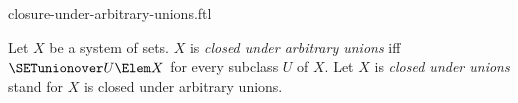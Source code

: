 \documentclass{stex}
\begin{document}
\begin{smodule}{closure-under-arbitrary-unions.ftl}

\begin{definition}[forthel]
  Let $X$ be a system of sets.
  $X$ is \emph{closed under arbitrary unions} iff $\SETunionover U \Elem X$ for every  subclass $U$ of $X$.
  Let $X$ is \emph{closed under unions} stand for $X$ is closed under arbitrary unions.
\end{definition}
\end{smodule}
\end{document}
